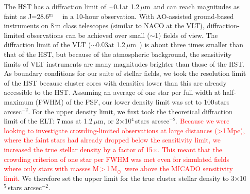 \documentclass{aa}
\newcommand{\m}{$^\mathrm{m}$~}
\newcommand{\um}{$\mu$m~}
\newcommand{\ume}{$\mu$m}
\newcommand{\msun}{M$_\odot$~}
\newcommand{\s}{$\sim$}
\newcommand{\h}[1]{$^{#1}$}
\newcommand{\spae}{stars arcsec$^{-2}$}
\newcommand{\langedit}[1]{\textcolor{red}{#1}}
\begin{document}
The HST has a diffraction limit of \s0.1\arcsec at 1.2\,\um and can reach magnitudes as faint as J=28.6\m~\citep{hst_wfc3} in a 10-hour observation.
With AO-assisted ground-based instruments on 8\,m class telescopes (similar to NACO at the VLT), diffraction-limited observations can be achieved over small (\s1\arcmin) fields of view.
The diffraction limit of the VLT (\s0.03\arcsec at 1.2\,\um) is about three times smaller than that of the HST, but because of the atmospheric background, the sensitivity limits of VLT instruments are many magnitudes brighter than those of the HST\@.
As boundary conditions for our suite of stellar fields, we took the resolution limit of the HST because cluster cores with densities lower than this are already accessible to the HST\@.
Assuming an average of one star per full width at half-maximum (FWHM) of the PSF, our lower density limit was set to 100\,\spae.
For the upper density limit, we first took the theoretical diffraction limit of the ELT: 7\,mas at 1.2\,\ume, or 2$\times$10\h4\,\spae.
\langedit{Because we were looking to investigate crowding-limited observations at large distances (\textgreater1\,Mpc), where the faint stars had already dropped below the sensitivity limit, we increased the true stellar density by a factor of 15$\times$.
This meant that the crowding criterion of one star per FWHM was met even for simulated fields where only stars with masses M\,\textgreater\,1\,\msun were above the MICADO sensitivity limit.}
We therefore set the upper limit for the true cluster stellar density to 3$\times$10\h5\,\spae.
\end{document}
